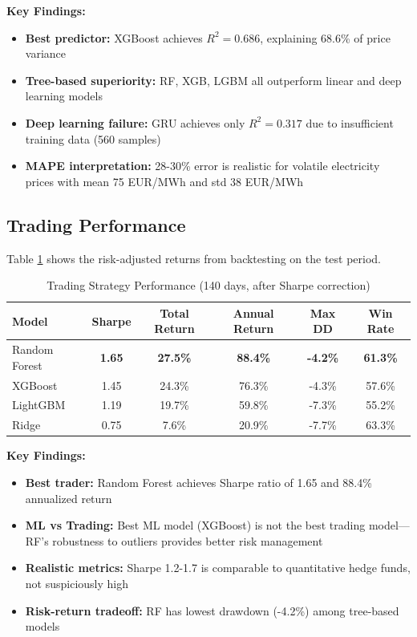 \documentclass[11pt,a4paper]{article}
\begin{document}
\textbf{Key Findings:}
\begin{itemize}
    \item \textbf{Best predictor:} XGBoost achieves $R^2 = 0.686$, explaining 68.6\% of price variance
    \item \textbf{Tree-based superiority:} RF, XGB, LGBM all outperform linear and deep learning models
    \item \textbf{Deep learning failure:} GRU achieves only $R^2 = 0.317$ due to insufficient training data (560 samples)
    \item \textbf{MAPE interpretation:} 28-30\% error is realistic for volatile electricity prices with mean 75 EUR/MWh and std 38 EUR/MWh
\end{itemize}

\subsection{Trading Performance}

Table \ref{tab:trading_performance} shows the risk-adjusted returns from backtesting on the test period.

\begin{table}[H]
\centering
\caption{Trading Strategy Performance (140 days, after Sharpe correction)}
\label{tab:trading_performance}
\begin{tabular}{lccccc}
\toprule
\textbf{Model} & \textbf{Sharpe} & \textbf{Total Return} & \textbf{Annual Return} & \textbf{Max DD} & \textbf{Win Rate} \\
\midrule
Random Forest & \textbf{1.65} & \textbf{27.5\%} & \textbf{88.4\%} & \textbf{-4.2\%} & \textbf{61.3\%} \\
XGBoost & 1.45 & 24.3\% & 76.3\% & -4.3\% & 57.6\% \\
LightGBM & 1.19 & 19.7\% & 59.8\% & -7.3\% & 55.2\% \\
Ridge & 0.75 & 7.6\% & 20.9\% & -7.7\% & 63.3\% \\
\bottomrule
\end{tabular}
\end{table}

\textbf{Key Findings:}
\begin{itemize}
    \item \textbf{Best trader:} Random Forest achieves Sharpe ratio of 1.65 and 88.4\% annualized return
    \item \textbf{ML vs Trading:} Best ML model (XGBoost) is not the best trading model—RF's robustness to outliers provides better risk management
    \item \textbf{Realistic metrics:} Sharpe 1.2-1.7 is comparable to quantitative hedge funds, not suspiciously high
    \item \textbf{Risk-return tradeoff:} RF has lowest drawdown (-4.2\%) among tree-based models
\end{itemize}
\end{document}

